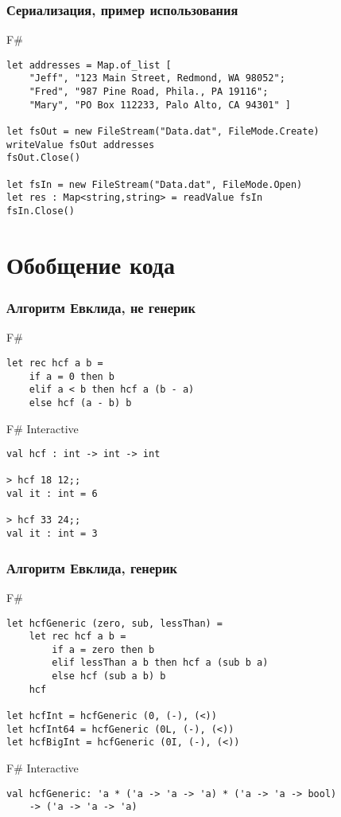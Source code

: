 \documentclass[xetex,mathserif,serif]{beamer}
\begin{document}
	\begin{frame}[fragile]
		\frametitle{Сериализация, пример использования}
		\begin{exampleblock}{F\#}
			\begin{lstlisting}
let addresses = Map.of_list [ 
    "Jeff", "123 Main Street, Redmond, WA 98052";
    "Fred", "987 Pine Road, Phila., PA 19116";
    "Mary", "PO Box 112233, Palo Alto, CA 94301" ]

let fsOut = new FileStream("Data.dat", FileMode.Create)
writeValue fsOut addresses
fsOut.Close()

let fsIn = new FileStream("Data.dat", FileMode.Open)
let res : Map<string,string> = readValue fsIn
fsIn.Close()
\end{lstlisting}
\end{exampleblock}
\end{frame}

	\section{Обобщение кода}

	\begin{frame}[fragile]
		\frametitle{Алгоритм Евклида, не генерик}
		\begin{exampleblock}{F\#}
			\begin{lstlisting}
let rec hcf a b =
    if a = 0 then b
    elif a < b then hcf a (b - a)
    else hcf (a - b) b
\end{lstlisting}
\end{exampleblock}

\begin{alertblock}{F\# Interactive}
\begin{lstlisting}[keywordstyle=\color{black}]
val hcf : int -> int -> int

> hcf 18 12;;
val it : int = 6

> hcf 33 24;;
val it : int = 3
\end{lstlisting}
\end{alertblock}
\end{frame}

	\begin{frame}[fragile]
		\frametitle{Алгоритм Евклида, генерик}
		\begin{exampleblock}{F\#}
			\begin{lstlisting}
let hcfGeneric (zero, sub, lessThan) =
    let rec hcf a b =
        if a = zero then b
        elif lessThan a b then hcf a (sub b a)
        else hcf (sub a b) b
    hcf    
    
let hcfInt = hcfGeneric (0, (-), (<))
let hcfInt64 = hcfGeneric (0L, (-), (<))
let hcfBigInt = hcfGeneric (0I, (-), (<))
\end{lstlisting}
\end{exampleblock}

\begin{alertblock}{F\# Interactive}
\begin{lstlisting}[keywordstyle=\color{black}]
val hcfGeneric: 'a * ('a -> 'a -> 'a) * ('a -> 'a -> bool) 
    -> ('a -> 'a -> 'a)
\end{lstlisting}
\end{alertblock}
\end{frame}
\end{document}
